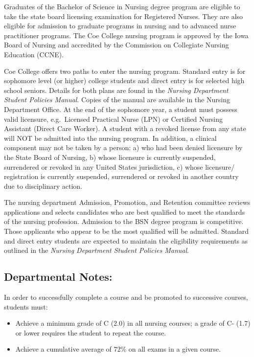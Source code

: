 \documentclass[
  letterpaper,
]{scrbook}
\providecommand{\tightlist}{%
  \setlength{\itemsep}{0pt}\setlength{\parskip}{0pt}}
\begin{document}
Graduates of the Bachelor of Science in Nursing degree program are
eligible to take the state board licensing examination for Registered
Nurses. They are also eligible for admission to graduate programs in
nursing and to advanced nurse practitioner programs. The Coe College
nursing program is approved by the Iowa Board of Nursing and accredited
by the Commission on Collegiate Nursing Education (CCNE).

Coe College offers two paths to enter the nursing program. Standard
entry is for sophomore level (or higher) college students and direct
entry is for selected high school seniors. Details for both plans are
found in the \emph{Nursing Department Student Policies Manual}. Copies
of the manual are available in the Nursing Department Office. At the end
of the sophomore year, a student must possess valid licensure,
e.g.~Licensed Practical Nurse (LPN) or Certified Nursing Assistant
(Direct Care Worker). A student with a revoked license from any state
will NOT be admitted into the nursing program. In addition, a clinical
component may not be taken by a person: a) who had been denied licensure
by the State Board of Nursing, b) whose licensure is currently
suspended, surrendered or revoked in any United States jurisdiction, c)
whose licensure/ registration is currently suspended, surrendered or
revoked in another country due to disciplinary action.

The nursing department Admission, Promotion, and Retention committee
reviews applications and selects candidates who are best qualified to
meet the standards of the nursing profession. Admission to the BSN
degree program is competitive. Those applicants who appear to be the
most qualified will be admitted. Standard and direct entry students are
expected to maintain the eligibility requirements as outlined in the
\emph{Nursing Department Student Policies Manual}.

\subsection{Departmental Notes:}\label{departmental-notes-1}

In order to successfully complete a course and be promoted to successive
courses, students must:

\begin{itemize}
\tightlist
\item
  Achieve a minimum grade of C (2.0) in all nursing courses; a grade of
  C- (1.7) or lower requires the student to repeat the course.
\item
  Achieve a cumulative average of 72\% on all exams in a given course.
\end{itemize}
\end{document}
